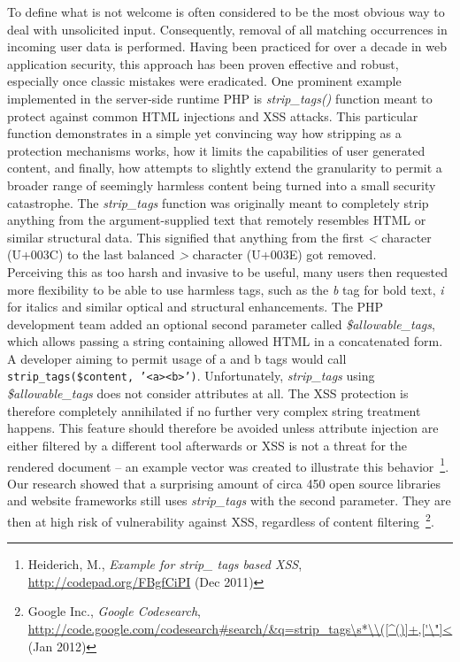     To define what is not welcome is often considered to be the most obvious way to deal with unsolicited input. Consequently, removal of all matching occurrences in incoming user data is performed. Having been practiced for over a decade in web application security, this approach has been proven effective and robust, especially once classic mistakes were eradicated. One prominent example implemented in the server-side runtime PHP is \textit{strip\_tags()} function meant to protect against common HTML injections and XSS attacks. This particular function demonstrates in a simple yet convincing way how stripping as a protection mechanisms works, how it limits the capabilities of user generated content, and finally, how attempts to slightly extend the granularity to permit a broader range of seemingly harmless content being turned into a small security catastrophe. The \textit{strip\_tags} function was originally meant to completely strip anything from the argument-supplied text that remotely resembles HTML or 
similar structural data. This signified that anything from the first \textit{<} character (U+003C) to the last balanced \textit{>} character (U+003E) got removed.\\
    
    Perceiving this as too harsh and invasive to be useful, many users then requested more flexibility to be able to use harmless tags, such as the \textit{b} tag for bold text, \textit{i} for italics and similar optical and structural enhancements. The PHP development team added an optional second parameter called \textit{\$allowable\_tags}, which allows passing a string containing allowed HTML in a concatenated form. A developer aiming to permit usage of a and b tags would call \texttt{strip\_tags(\$content, '<a><b>')}. Unfortunately, \textit{strip\_tags} using \textit{\$allowable\_tags} does not consider attributes at all. The XSS protection is therefore completely annihilated if no further very complex string treatment happens. This feature should therefore be avoided unless attribute injection are either filtered by a different tool afterwards or XSS is not a threat for the rendered document -- an example vector was created to illustrate this behavior~\footnote{Heiderich, M., \textit{Example for strip\_
tags based XSS}, \url{http://codepad.org/FBgfCiPI} (Dec 2011)}. Our research showed that a surprising amount of circa 450 open source libraries and website frameworks still uses \textit{strip\_tags} with the second parameter. They are then at high risk of vulnerability against XSS, regardless of content filtering~\footnote{Google Inc., \textit{Google Codesearch}, \url{http://code.google.com/codesearch#search/&q=strip_tags\s*\\([^()]+,['\"]<} (Jan 2012)}.\\

